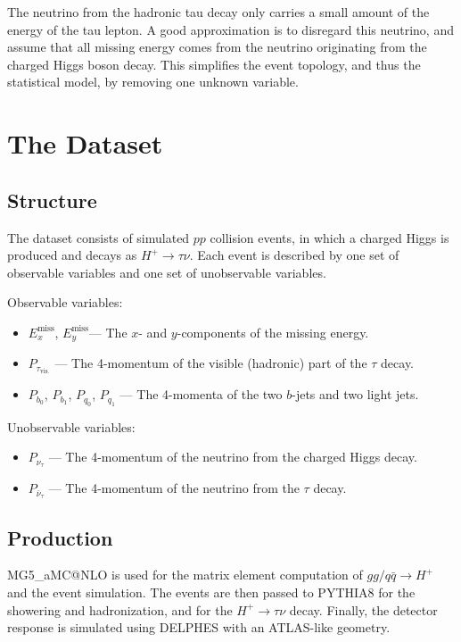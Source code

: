 \documentclass{scrartcl}
\newcommand{\exmiss}{$E_x^\text{miss}$}
\newcommand{\eymiss}{$E_y^\text{miss}$}
\begin{document}
The neutrino from the hadronic tau decay only carries a small amount of the energy of the tau lepton. A good approximation is to disregard this neutrino, and assume that all missing energy comes from the neutrino originating from the charged Higgs boson decay. This simplifies the event topology, and thus the statistical model, by removing one unknown variable.

\section{The Dataset}
\subsection{Structure}
The dataset consists of simulated $pp$ collision events, in which a charged Higgs is produced and decays as $H^+\to\tau\nu$. Each event is described by one set of observable variables and one set of unobservable variables.

Observable variables:
\begin{itemize}
    \item \exmiss, \eymiss --- The $x$- and $y$-components of the missing energy.
    \item $P_{\tau_\mathrm{vis.}}$ --- The 4-momentum of the visible (hadronic) part of the $\tau$ decay.
    \item $P_{b_0}$, $P_{b_1}$, $P_{q_0}$, $P_{q_1}$ --- The 4-momenta of the two $b$-jets and two light jets.
\end{itemize}

Unobservable variables:
\begin{itemize}
    \item $P_{\nu_\tau}$ --- The 4-momentum of the neutrino from the charged Higgs decay.
    \item $P_{\bar\nu_\tau}$ --- The 4-momentum of the neutrino from the $\tau$ decay.
\end{itemize}

\subsection{Production}
MG5\_aMC@NLO \cite{Alwall:2014hca} is used for the matrix element computation of $gg / q \bar q \to H^+$ and the event simulation. The events are then passed to PYTHIA8 \cite{Sjöstrand2015159} for the showering and hadronization, and for the $H^+\to \tau\nu$ decay. Finally, the detector response is simulated using DELPHES \cite{Favereau2014} with an ATLAS-like geometry.
\end{document}
